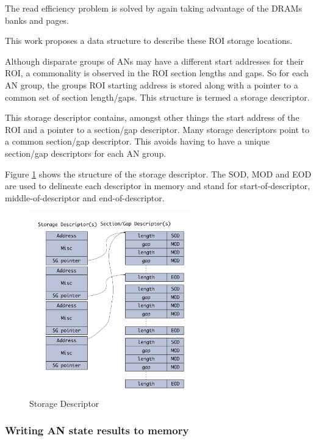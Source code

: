 \documentclass[journal]{IEEEtran}
\begin{document}
The read efficiency problem is solved by again taking advantage of the DRAMs banks and pages.

This work proposes a data structure to describe these ROI storage locations.

Although disparate groups of ANs may have a different start addresses for their ROI, a commonality is observed in the ROI section lengths and gaps. So for each AN group, the groups ROI starting address is stored along with a pointer to a common set of section length/gaps. This structure is termed a storage descriptor.

This storage descriptor contains, amongst other things the start address of the ROI and a pointer to a section/gap descriptor. Many storage descriptors point to a common section/gap descriptor. This avoids having to have a unique section/gap descriptors for each AN group.

Figure \ref{fig:storageDescriptor} shows the structure of the storage descriptor. The SOD, MOD and EOD are used to delineate each descriptor in memory and stand for start-of-descriptor, middle-of-descriptor and end-of-descriptor.

\begin{figure}[!t]
\centerline{
\mbox{\includegraphics[width=2.75in]{storageDesc.jpg}}
}
\caption{Storage Descriptor}
\label{fig:storageDescriptor}
\end{figure}

\subsubsection{Writing AN state results to memory}
\label{ssec:writingANStates}
\end{document}
